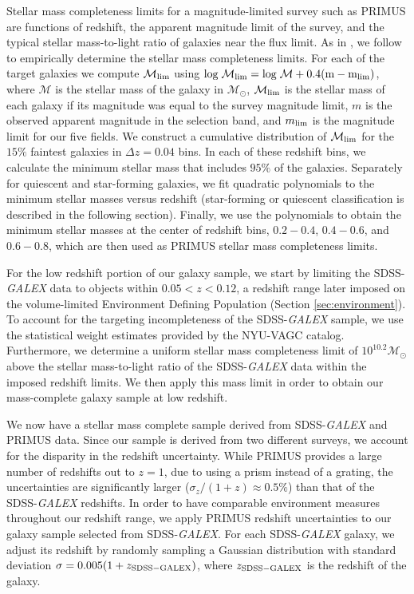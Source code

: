 \documentclass{emulateapj}
\begin{document}
Stellar mass completeness limits for a magnitude-limited survey such as PRIMUS are functions of redshift, the apparent magnitude limit of the survey, and the typical stellar mass-to-light ratio of galaxies near the flux limit. As in \cite{Moustakas:2013aa}, we follow \cite{Pozzetti:2010aa} to empirically determine the stellar mass completeness limits. For each of the target galaxies we compute $\mathcal{M}_{\rm{lim}}$ using $\rm{log} \; \mathcal{M}_{\mathrm{lim}} = \mathrm{log} \; \mathcal{M} + 0.4 (m - m_{\mathrm{lim}})$, where $\mathcal{M}$ is the stellar mass of the galaxy in $\mathcal{M_{\odot}}$, $\mathcal{M}_{\rm{lim}}$ is the stellar mass of each galaxy if its magnitude was equal to the survey magnitude limit, $m$ is the observed apparent magnitude in the selection band, and $m_{\rm{lim}}$ is the magnitude limit for our five fields. We construct a cumulative distribution of $\mathcal{M}_{\rm{lim}}$ for the $15\%$ faintest galaxies in $\Delta z=0.04$ bins. In each of these redshift bins, we calculate the minimum stellar mass that includes $95 \%$ of the galaxies. Separately for quiescent and star-forming galaxies, we fit quadratic polynomials to the minimum stellar masses versus redshift (star-forming or quiescent classification is described in the following section). Finally, we use the polynomials to obtain the minimum stellar masses at the center of redshift bins, $0.2-0.4$, $0.4-0.6$, and $0.6-0.8$, which are then used as PRIMUS stellar mass completeness limits.

For the low redshift portion of our galaxy sample, we start by limiting the SDSS-{\em GALEX} data to objects within $0.05 < z < 0.12$, a redshift range later imposed on the volume-limited Environment Defining Population (Section \ref{sec:environment}). To account for the targeting incompleteness of the SDSS-{\em GALEX} sample, we use the statistical weight estimates provided by the NYU-VAGC catalog. Furthermore, we determine a uniform stellar mass completeness limit of $10^{10.2} \mathcal{M}_{\odot}$ above the stellar mass-to-light ratio of the SDSS-{\em GALEX} data within the imposed redshift limits. We then apply this mass limit in order to obtain our mass-complete galaxy sample at low redshift. 

We now have a stellar mass complete sample derived from SDSS-{\em GALEX} and PRIMUS data. Since our sample is derived from two different surveys, we account for the disparity in the redshift uncertainty. While PRIMUS provides a large number of redshifts out to $z = 1$, due to using a prism instead of a grating, the uncertainties are significantly larger ($\sigma_{z}/(1+z) \approx 0.5 \%$) than that of the SDSS-{\em GALEX} redshifts. In order to have comparable environment measures throughout our redshift range, we apply PRIMUS redshift uncertainties to our galaxy sample selected from SDSS-{\em GALEX}. For each SDSS-{\em GALEX} galaxy, we adjust its redshift by randomly sampling a Gaussian distribution with standard deviation $\sigma = 0.005 (1+z_{\rm{SDSS}-GALEX})$, where $z_{\rm{SDSS}-GALEX}$ is the redshift of the galaxy. 
\end{document}
